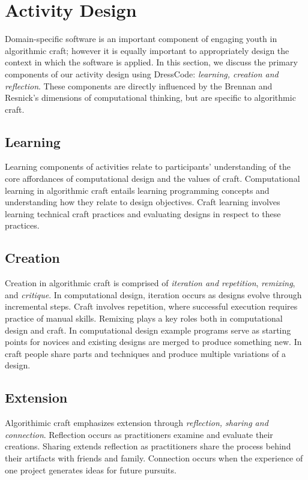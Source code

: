 \documentclass{sigchi}
\begin{document}
\section{Activity Design}
Domain-specific software is an important component of engaging youth in algorithmic craft; however it is equally important to appropriately design the context in which the software is applied. In this section, we discuss the primary components of our activity design using DressCode: \emph{learning, creation and reflection}. These components are directly influenced by the Brennan and Resnick's dimensions of computational thinking\cite{computational_thinking}, but are specific to algorithmic craft.

\subsection{Learning}
Learning components of activities relate to participants' understanding of the core affordances of computational design and the values of craft. Computational learning in algorithmic craft entails learning programming concepts and understanding how they relate to design objectives. Craft learning involves learning technical craft practices and evaluating designs in respect to these practices.

\subsection{Creation}
Creation in algorithmic craft is comprised of \emph{iteration and repetition}, \emph{remixing}, and \emph{critique}. In computational design, iteration occurs as designs evolve through incremental steps. Craft involves repetition, where successful execution requires practice of manual skills. Remixing plays a key roles both in computational design and craft. In computational design example programs serve as starting points for novices and existing designs are merged to produce something new. In craft people share parts and techniques and produce multiple variations of a design.

\subsection{Extension}
Algorithimic craft emphasizes extension through \emph{reflection, sharing and connection}. Reflection occurs as practitioners examine and evaluate their creations. Sharing extends reflection as practitioners share the process behind their artifacts with friends and family. Connection occurs when the experience of one project generates ideas for future pursuits.
\end{document}
